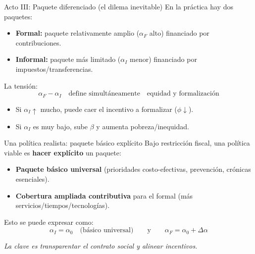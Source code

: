 \documentclass[10pt]{beamer}
\begin{document}

\begin{frame}{Acto III: Paquete diferenciado (el dilema inevitable)}
En la práctica hay dos paquetes:

\begin{itemize}
  \item \textbf{Formal:} paquete relativamente amplio (\(\alpha_F\) alto) financiado por contribuciones.
  \item \textbf{Informal:} paquete más limitado (\(\alpha_I\) menor) financiado por impuestos/transferencias.
\end{itemize}

\bigskip
La tensión:
\[
\alpha_F - \alpha_I \quad \text{define simultáneamente} \quad
\text{equidad y formalización}
\]

\bigskip
\begin{itemize}
  \item Si \(\alpha_I \uparrow\) mucho, puede caer el incentivo a formalizar (\(\phi\downarrow\)).
  \item Si \(\alpha_I\) es muy bajo, sube \(\beta\) y aumenta pobreza/inequidad.
\end{itemize}
\end{frame}

\begin{frame}{Una política realista: paquete básico explícito}
Bajo restricción fiscal, una política viable es \textbf{hacer explícito} un paquete:

\begin{itemize}
  \item \textbf{Paquete básico universal} (prioridades costo-efectivas, prevención, crónicas esenciales).
  \item \textbf{Cobertura ampliada contributiva} para el formal (más servicios/tiempos/tecnologías).
\end{itemize}

\bigskip
Esto se puede expresar como:
\[
\alpha_I = \alpha_0 \quad \text{(básico universal)}
\qquad \text{y}\qquad
\alpha_F = \alpha_0 + \Delta\alpha
\]

\bigskip
\emph{La clave es transparentar el contrato social y alinear incentivos.}
\end{frame}

\end{document}
